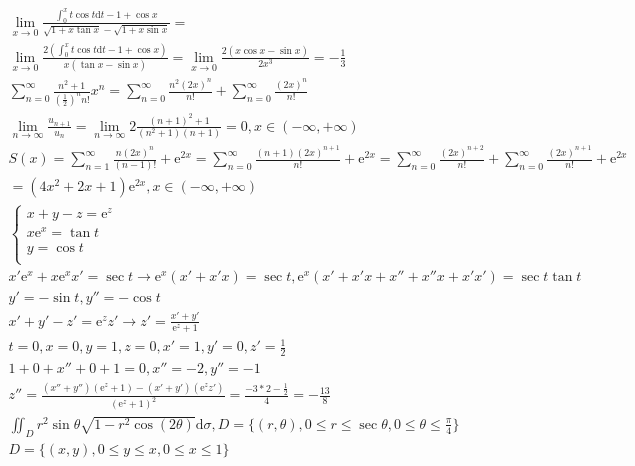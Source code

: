 \documentclass{article}
\begin{document}
\begin{align*}
    \lim_{x \to 0} \frac{\int_{0}^{x}t\cos t\mathrm{d}t - 1 + \cos x }{\sqrt{1+x\tan x}-\sqrt{1+x\sin x}} = \\
    \lim_{x \to 0} \frac{2(\int_{0}^{x}t\cos t\mathrm{d}t-1+\cos x)}{x(\tan x -\sin x)} = \lim_{x \to 0 }\frac{2(x\cos x-\sin x)}{2x^3} = -\frac{1}{3} \\
    \sum_{n=0}^{\infty} \frac{n^2+1}{(\frac{1}{2})^n n!} x^{n} = \sum_{n=0}^{\infty}\frac{n^2 (2x)^{n}}{n!} + \sum_{n=0}^{\infty}\frac{(2x)^n}{n!} \\
    \lim_{n \to \infty} \frac{u_{n+1}}{u_{n}} = \lim_{n \to \infty} 2\frac{(n+1)^2+1}{(n^2+1)(n+1)} = 0, x \in (-\infty,+\infty) \\
    S(x) = \sum_{n=1}^{\infty}\frac{n(2x)^n}{(n-1)!} + \mathrm{e}^{2x} = \sum_{n=0}^{\infty}\frac{(n+1)(2x)^{n+1}}{n!}+\mathrm{e}^{2x} = \sum_{n=0}^{\infty}\frac{(2x)^{n+2}}{n!}+\sum_{n=0}^{\infty}\frac{(2x)^{n+1}}{n!} + \mathrm{e}^{2x} \\
    = (4x^2+2x+1)\mathrm{e}^{2x} , x \in (-\infty,+\infty) \\  
    \left\{
        \begin{array}{rl}
            x + y - z = \mathrm{e}^{z} \\
            x\mathrm{e}^{x} = \tan t \\
            y = \cos t \\ 
        \end{array}
    \right. \\ 
    x'\mathrm{e}^x+x\mathrm{e}^{x}x'=\sec t \rightarrow \mathrm{e}^{x}(x'+x'x) = \sec t , \mathrm{e}^{x}(x'+x'x+x''+x''x+x'x') = \sec t \tan t \\ 
    y' = -\sin t , y'' = -\cos t\\
    x'+y'-z'=\mathrm{e}^{z}z' \rightarrow z' = \frac{x'+y'}{\mathrm{e}^{z}+1} \\ 
    t = 0 , x = 0 , y =  1 , z = 0 ,x' = 1,y'=0,z' = \frac{1}{2} \\
    1+0+x''+0+1= 0,x''=-2, y'' = -1 \\  
    z'' = \frac{(x''+y'')(\mathrm{e}^{z}+1)-(x'+y')(\mathrm{e}^{z}z')}{(\mathrm{e}^{z}+1)^2} = \frac{-3*2-\frac{1}{2}}{4} = -\frac{13}{8}\\
    \iint_{D}r^2\sin \theta \sqrt{1-r^2\cos (2\theta)}\mathrm{d}\sigma , D = \{(r,\theta),0 \le r \le \sec \theta,0 \le \theta \le \frac{\pi}{4}\} \\
    D = \{(x,y),0 \le y \le x , 0 \le x \le 1\} \\ 

\end{align*}
\end{document}
